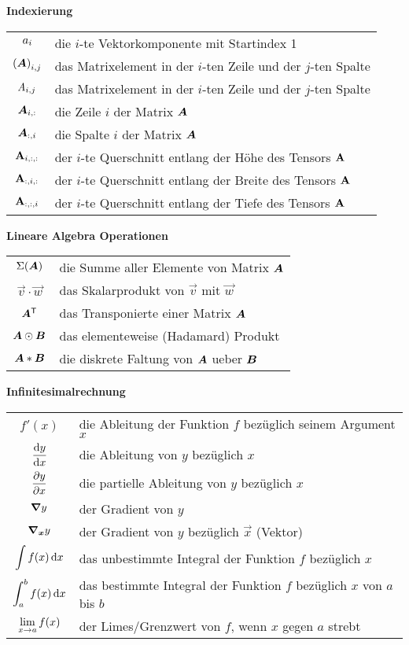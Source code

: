 \begin{center}\textbf{Indexierung}\end{center}
\begin{tabular}{cl}
  $a_i$ & die $i$-te Vektorkomponente mit Startindex 1 \\
  ${(\bm{A})}_{i,j}$ & das Matrixelement in der $i$-ten Zeile und der $j$-ten Spalte \\
  $\mathit{A}_{i,j}$ & das Matrixelement in der $i$-ten Zeile und der $j$-ten Spalte \\
  $\bm{A}_{i,:}$ & die Zeile $i$ der Matrix $\bm{A}$ \\
  $\bm{A}_{:,i}$ & die Spalte $i$ der Matrix $\bm{A}$\ \\
  $\mathbf{A}_{i,:,:}$ & der $i$-te Querschnitt entlang der Höhe des Tensors $\mathbf{A}$ \\
  $\mathbf{A}_{:,i,:}$ & der $i$-te Querschnitt entlang der Breite des Tensors $\mathbf{A}$ \\
  $\mathbf{A}_{:,:,i}$ & der $i$-te Querschnitt entlang der Tiefe des Tensors $\mathbf{A}$ \\
\end{tabular}

\begin{center}\textbf{Lineare Algebra Operationen}\end{center}
\begin{tabular}{cl}
  $\Sigma(\bm{A})$ & die Summe aller Elemente von Matrix $\bm{A}$ \\
  $\vec{v} \cdot \vec{w}$ & das Skalarprodukt von $\vec{v}$ mit $\vec{w}$ \\
  $\bm{A}^{\mathsf{T}}$ & das Transponierte einer Matrix $\bm{A}$ \\
  $\bm{A} \odot \bm{B}$ & das elementeweise (Hadamard) Produkt \\
  $\bm{A} * \bm{B}$ & die diskrete Faltung von $\bm{A}$ ueber $\bm{B}$

\end{tabular}

\begin{center}\textbf{Infinitesimalrechnung}\end{center}
\begin{tabular}{cl}
  $f'(x)$ & die Ableitung der Funktion $f$ bezüglich seinem Argument $x$ \\
  $\displaystyle\frac{\text{d}y}{\text{d}x}$ & die Ableitung von $y$ bezüglich $x$ \\[2ex]
  $\displaystyle\frac{\partial y}{\partial x}$ & die partielle Ableitung von $y$ bezüglich $x$ \\[2ex]
  $\bm{\nabla} y$ & der Gradient von $y$\\
  $\bm{\nabla}_{\bm{x}}y$ & der Gradient von $y$ bezüglich $\vec{x}$ (Vektor) \\
  $\displaystyle\int f(x)\,\text{d}x$ & das unbestimmte Integral der Funktion $f$ bezüglich $x$ \\
  $\displaystyle\int_a^b f(x)\,\text{d}x$ & das bestimmte Integral der Funktion $f$ bezüglich $x$ von $a$ bis $b$ \\
  $\displaystyle\lim_{x \to a} f(x)$ & der Limes/Grenzwert von $f$, wenn $x$ gegen $a$ strebt \\

\end{tabular}

